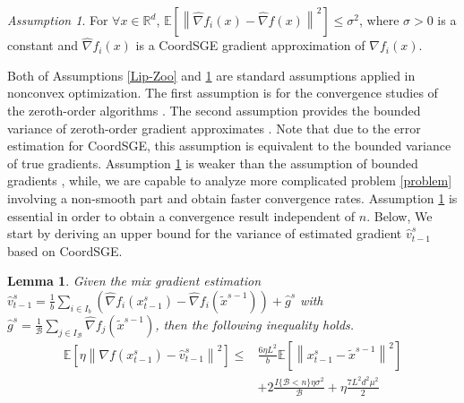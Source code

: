 \documentclass{article}
\newcommand*{\R}{\mathbb{R}}
\newcommand*{\E}{\mathbb{E}}
\newcommand{\norm}[1]{\left\lVert#1\right\rVert}
\newtheorem{lemma}[theorem]{Lemma}
\theoremstyle{definition}
\theoremstyle{remark}
\newtheorem{assumption}[theorem]{Assumption}
\begin{document}
\begin{assumption}\label{Var-Zoo}
For $\forall x\in\R^d$, $\E\left[\norm{\hat{\nabla} f_i(x) - \hat{\nabla} f(x)}^2\right] \leq \sigma^2$, where $\sigma > 0$ is a constant and $\hat{\nabla} f_i(x)$ is a CoordSGE gradient approximation of $\nabla f_i(x)$.
\end{assumption}
Both of Assumptions \ref{Lip-Zoo} and \ref{Var-Zoo} are standard assumptions applied in nonconvex optimization. The first assumption is for the convergence studies of the zeroth-order algorithms \cite{ghadimi2016accelerated,nesterov2017random,
liu2018zeroth}. The second assumption provides the bounded variance of zeroth-order gradient approximates \cite{lian2016comprehensive,liu2018stochastic,
liu2018zeroth,hajinezhad2017zeroth}. Note that due to the error estimation for CoordSGE, this assumption is equivalent to the bounded  variance of true gradients. Assumption \ref{Var-Zoo} is weaker than the assumption of bounded gradients  \cite{liu2017zeroth,hajinezhad2017zeroth},
while, we are capable to analyze more complicated problem \eqref{problem} involving a non-smooth part and obtain faster convergence rates. Assumption \ref{Var-Zoo} is essential in order to obtain a convergence result independent of $n$.
Below, We start by deriving an upper bound for the variance of estimated gradient $\hat{v}_{t-1}^s$ based on CoordSGE.
\begin{lemma}\label{var-estimate-lem}
Given the mix gradient estimation $\hat{v}_{t-1}^s = \frac{1}{b} \sum_{i\in I_b}\left(\hat{\nabla} f_{i}(x_{t-1}^s)-\hat{\nabla} f_{i}(\tilde{x}^{s-1})\right)+\hat{g}^s$ with $\hat{g}^s = \frac{1}{\mathcal{B}} \sum_{j\in I_{\mathcal{B}}} \hat{\nabla} f_j (\tilde{x}^{s-1})$, then the following inequality holds. 
\begin{equation}
\begin{split}
\E\left[\eta\norm{\nabla f(x_{t-1}^s)-{\hat{v}_{t-1}^s}}^2\right] \leq&  \frac{6\eta L^2}{b}\E\left[\norm{x_{t-1}^s-\tilde{x}^{s-1}}^2\right]\\
&+ 2\frac{I\{\mathcal{B} < n\}\eta \sigma ^2}{\mathcal{B}}+\eta \frac{7 L^2 d^2 \mu^2}{2}
\end{split}
\end{equation}
\end{lemma}
\end{document}
